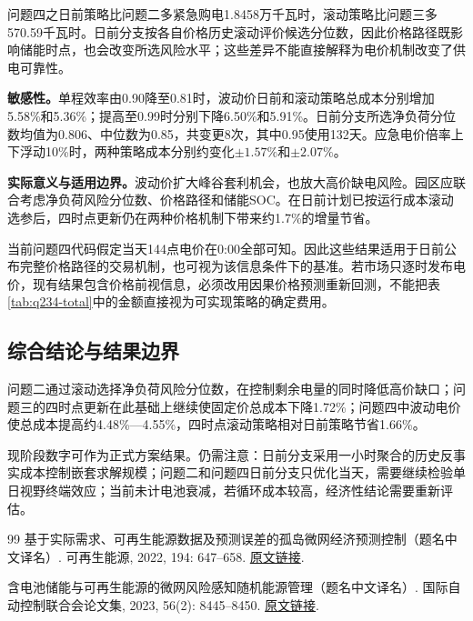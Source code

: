 \documentclass[UTF8,a4paper,12pt,fontset=fandol]{ctexart}
\numberwithin{equation}{section}
\begin{document}
问题四之日前策略比问题二多紧急购电1.8458万千瓦时，滚动策略比问题三多570.59千瓦时。日前分支按各自价格历史滚动评价候选分位数，因此价格路径既影响储能时点，也会改变所选风险水平；这些差异不能直接解释为电价机制改变了供电可靠性。

\textbf{敏感性。}单程效率由0.90降至0.81时，波动价日前和滚动策略总成本分别增加5.58\%和5.36\%；提高至0.99时分别下降6.50\%和5.91\%。日前分支所选净负荷分位数均值为0.806、中位数为0.85，共变更8次，其中0.95使用132天。应急电价倍率上下浮动10\%时，两种策略成本分别约变化$\pm1.57\%$和$\pm2.07\%$。

\textbf{实际意义与适用边界。}波动价扩大峰谷套利机会，也放大高价缺电风险。园区应联合考虑净负荷风险分位数、价格路径和储能SOC。在日前计划已按运行成本滚动选参后，四时点更新仍在两种价格机制下带来约1.7\%的增量节省。

当前问题四代码假定当天144点电价在0:00全部可知。因此这些结果适用于日前公布完整价格路径的交易机制，也可视为该信息条件下的基准。若市场只逐时发布电价，现有结果包含价格前视信息，必须改用因果价格预测重新回测，不能把表\ref{tab:q234-total}中的金额直接视为可实现策略的确定费用。

\subsection{综合结论与结果边界}

问题二通过滚动选择净负荷风险分位数，在控制剩余电量的同时降低高价缺口；问题三的四时点更新在此基础上继续使固定价总成本下降1.72\%；问题四中波动电价使总成本提高约4.48\%---4.55\%，四时点滚动策略相对日前策略节省1.66\%。

现阶段数字可作为正式方案结果。仍需注意：日前分支采用一小时聚合的历史反事实成本控制嵌套求解规模；问题二和问题四日前分支只优化当天，需要继续检验单日视野终端效应；当前未计电池衰减，若循环成本较高，经济性结论需要重新评估。


\clearpage
\begin{thebibliography}{99}
基于实际需求、可再生能源数据及预测误差的孤岛微网经济预测控制（题名中文译名）.
可再生能源, 2022, 194: 647--658.
\href{https://doi.org/10.1016/j.renene.2022.05.103}{原文链接}.

含电池储能与可再生能源的微网风险感知随机能源管理（题名中文译名）.
国际自动控制联合会论文集, 2023, 56(2): 8445--8450.
\href{https://doi.org/10.1016/j.ifacol.2023.10.1042}{原文链接}.
\end{thebibliography}
\end{document}
